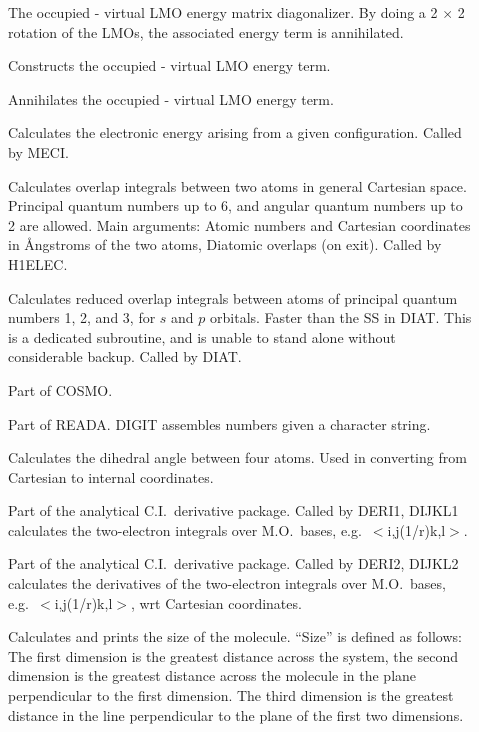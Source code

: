 \begin{description}
\item[] The occupied - virtual LMO energy matrix diagonalizer. By
doing a 2 $\times$ 2 rotation of the LMOs, the associated energy term is
annihilated.

\item[] Constructs the occupied - virtual LMO energy term.

\item[] Annihilates the  occupied - virtual LMO energy term.

\item[] Calculates the electronic energy arising from a given
configuration. Called by MECI.

\item[] Calculates overlap integrals between two atoms in  general
Cartesian space. Principal quantum numbers up to 6, and angular quantum numbers
up to 2 are allowed. Main arguments: Atomic numbers and Cartesian coordinates
in \AA ngstroms of the  two atoms, Diatomic overlaps (on exit). Called by
H1ELEC.

\item[] Calculates reduced overlap integrals between atoms  of
principal quantum numbers 1, 2, and 3, for $s$ and $p$ orbitals. Faster than
the SS in DIAT. This is a dedicated subroutine, and is unable to stand alone
without considerable backup. Called by DIAT.

\item[] Part of COSMO.

\item[] Part of READA.  DIGIT assembles numbers given a  character
string.

\item[] Calculates the dihedral angle between four atoms. Used in
converting from Cartesian to internal coordinates.

\item[] Part of the analytical C.I.\ derivative package. Called by
DERI1, DIJKL1 calculates the two-electron integrals over M.O.\ bases, e.g.\
$<$i,j(1/r)k,l$>$.

\item[] Part of the analytical C.I.\ derivative package. Called by
DERI2, DIJKL2 calculates the derivatives of the two-electron  integrals over
M.O.\ bases, e.g.\ $<$i,j(1/r)k,l$>$, wrt Cartesian coordinates.

\item[] Calculates and prints the size of the molecule. ``Size''
is defined as follows: The first dimension is the greatest distance across the
system, the second dimension is the greatest distance across the molecule in
the plane perpendicular to the first dimension. The third dimension is the
greatest distance in the line perpendicular to the plane of the first two
dimensions.


\end{description}
